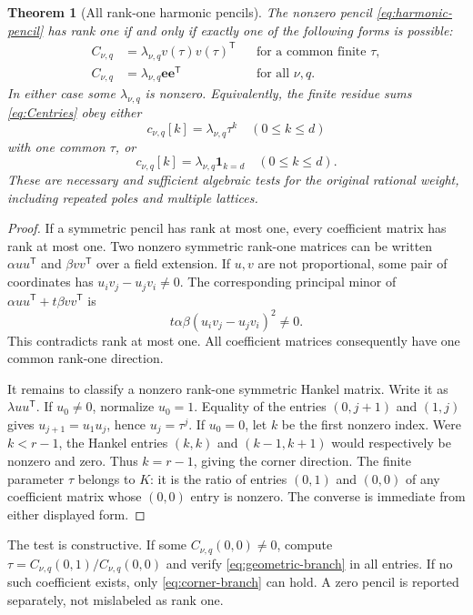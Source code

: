 \documentclass[11pt,letterpaper]{article}
\numberwithin{equation}{section}
\newtheorem{theorem}{Theorem}[section]
\theoremstyle{definition}\newtheorem{definition}[theorem]{Definition}
\theoremstyle{remark}\newtheorem{remark}[theorem]{Remark}
\newcommand{\ee}{\bm e}
\begin{document}
\begin{theorem}[All rank-one harmonic pencils]\label{thm:classification}
The nonzero pencil \eqref{eq:harmonic-pencil} has rank one if and only
if exactly one of the following forms is possible:
\begin{align}
 C_{\nu,q}&=\lambda_{\nu,q}v(\tau)v(\tau)^{\mathsf T}
       &&\text{for a common finite }\tau,\label{eq:geometric-branch}\\
 C_{\nu,q}&=\lambda_{\nu,q}\ee\ee^{\mathsf T}
       &&\text{for all }\nu,q.\label{eq:corner-branch}
\end{align}
In either case some $\lambda_{\nu,q}$ is nonzero. Equivalently, the
finite residue sums \eqref{eq:Centries} obey either
\[
 c_{\nu,q}[k]=\lambda_{\nu,q}\tau^k\quad(0\le k\le d)
\]
with one common $\tau$, or
\[
 c_{\nu,q}[k]=\lambda_{\nu,q}\mathbf1_{k=d}\quad(0\le k\le d).
\]
These are necessary and sufficient algebraic tests for the original
rational weight, including repeated poles and multiple lattices.
\end{theorem}
\begin{proof}
If a symmetric pencil has rank at most one, every coefficient matrix
has rank at most one. Two nonzero symmetric rank-one matrices can be
written $\alpha uu^{\mathsf T}$ and $\beta vv^{\mathsf T}$ over a
field extension. If $u,v$ are not proportional, some pair of coordinates
has $u_iv_j-u_jv_i\ne0$. The corresponding principal minor of
$\alpha uu^{\mathsf T}+t\beta vv^{\mathsf T}$ is
\[
 t\alpha\beta(u_iv_j-u_jv_i)^2\ne0.
\]
This contradicts rank at most one. All coefficient matrices consequently
have one common rank-one direction.

It remains to classify a nonzero rank-one symmetric Hankel matrix.
Write it as $\lambda uu^{\mathsf T}$. If $u_0\ne0$, normalize
$u_0=1$. Equality of the entries $(0,j+1)$ and $(1,j)$ gives
$u_{j+1}=u_1u_j$, hence $u_j=\tau^j$. If $u_0=0$, let $k$ be
the first nonzero index. Were $k<r-1$, the Hankel entries $(k,k)$
and $(k-1,k+1)$ would respectively be nonzero and zero. Thus
$k=r-1$, giving the corner direction. The finite parameter $\tau$
belongs to $K$: it is the ratio of entries $(0,1)$ and $(0,0)$ of
any coefficient matrix whose $(0,0)$ entry is nonzero. The converse
is immediate from either displayed form.
\end{proof}

The test is constructive. If some $C_{\nu,q}(0,0)\ne0$, compute
$\tau=C_{\nu,q}(0,1)/C_{\nu,q}(0,0)$ and verify
\eqref{eq:geometric-branch} in all entries. If no such coefficient
exists, only \eqref{eq:corner-branch} can hold. A zero pencil is
reported separately, not mislabeled as rank one.
\end{document}
